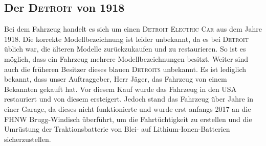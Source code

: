 \subsection{Der \textsc{Detroit} von 1918}
Bei dem Fahrzeug handelt es sich um einen \textsc{Detroit Electric Car} aus dem Jahre 1918. Die korrekte Modellbezeichnung ist leider unbekannt, da es bei \textsc{Detroit} üblich war, die älteren Modelle zurückzukaufen und zu restaurieren. So ist es möglich, dass ein Fahrzeug mehrere Modellbezeichnungen besitzt. Weiter sind auch die früheren Besitzer dieses blauen \textsc{Detroits} unbekannt. Es ist lediglich bekannt, dass unser Auftraggeber, Herr Jäger, das Fahrzeug von einem Bekannten gekauft hat. Vor diesem Kauf wurde das Fahrzeug in den USA restauriert und von diesem ersteigert. Jedoch stand das Fahrzeug über Jahre in einer Garage, da dieses nicht funktionierte und wurde erst anfangs 2017 an die FHNW Brugg-Windisch überführt, um die Fahrtüchtigkeit zu erstellen und die Umrüstung der Traktionsbatterie von Blei- auf Lithium-Ionen-Batterien sicherzustellen.


\newpage